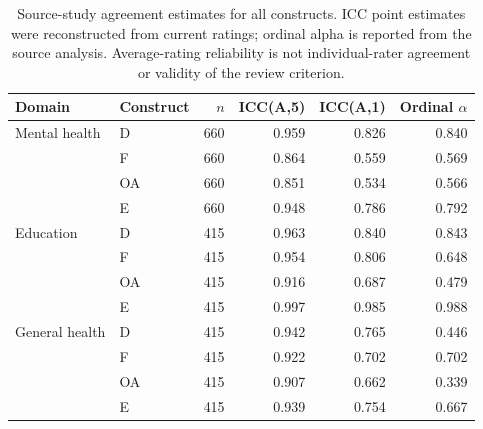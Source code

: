 \begin{table}[t]
\centering\small
\caption{Source-study agreement estimates for all constructs. ICC point estimates were reconstructed from current ratings; ordinal alpha is reported from the source analysis. Average-rating reliability is not individual-rater agreement or validity of the review criterion.}
\label{tab:reliability}
\begin{tabular}{llrrrr}
\toprule
Domain & Construct & $n$ & ICC(A,5) & ICC(A,1) & Ordinal $\alpha$ \\
\midrule
Mental health & D & 660 & 0.959 & 0.826 & 0.840 \\
 & F & 660 & 0.864 & 0.559 & 0.569 \\
 & OA & 660 & 0.851 & 0.534 & 0.566 \\
 & E & 660 & 0.948 & 0.786 & 0.792 \\
Education & D & 415 & 0.963 & 0.840 & 0.843 \\
 & F & 415 & 0.954 & 0.806 & 0.648 \\
 & OA & 415 & 0.916 & 0.687 & 0.479 \\
 & E & 415 & 0.997 & 0.985 & 0.988 \\
General health & D & 415 & 0.942 & 0.765 & 0.446 \\
 & F & 415 & 0.922 & 0.702 & 0.702 \\
 & OA & 415 & 0.907 & 0.662 & 0.339 \\
 & E & 415 & 0.939 & 0.754 & 0.667 \\
\bottomrule
\end{tabular}
\end{table}
